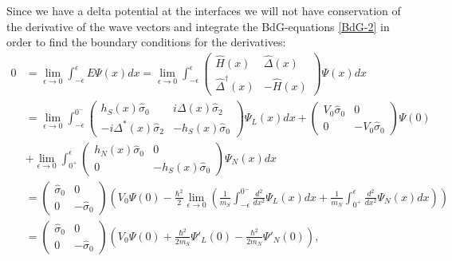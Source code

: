 Since we have a delta potential at the interfaces we will not have conservation of the derivative of the wave vectors and integrate the BdG-equations \eqref{BdG-2} in order to find the boundary conditions for the derivatives:
\begin{equation*}
\begin{split}
    0 &= \lim_{\epsilon \rightarrow 0} \int_{-\epsilon}^{\epsilon} E\Psi(x) dx = \lim_{\epsilon \rightarrow 0} \int_{-\epsilon}^{\epsilon}
    \begin{pmatrix}
    \hat{H}(x) & \hat{\Delta}(x) \\
    \hat{\Delta}^{\dagger}(x) & -\hat{H}(x)
    \end{pmatrix}
    \Psi(x)dx
    \\
    &=\lim_{\epsilon \rightarrow 0} \int_{-\epsilon}^{0^-}
    \begin{pmatrix}
    h_S(x)\hat{\sigma}_0 & i\Delta(x)\hat{\sigma}_2 \\
    -i\Delta^*(x)\hat{\sigma}_2 & -h_S(x)\hat{\sigma}_0
    \end{pmatrix}
    \Psi_{L}(x)dx
    +
    \begin{pmatrix}
    V_0\hat{\sigma}_0 & 0\\
    0 & -V_0\hat{\sigma}_0
    \end{pmatrix}
    \Psi(0)
    \\
    &+\lim_{\epsilon \rightarrow 0} \int_{0^+}^{\epsilon}
    \begin{pmatrix}
    h_N(x)\hat{\sigma}_0 & 0 \\
    0 & -h_S(x)\hat{\sigma}_0
    \end{pmatrix}
    \Psi_{N}(x)dx\\
    &=
    \begin{pmatrix}
    \hat{\sigma}_0 & 0\\
    0 & -\hat{\sigma}_0
    \end{pmatrix}
    \left(
    V_0\Psi(0)
    -\frac{\hbar^2}{2}
    \lim_{\epsilon \rightarrow 0}
    \left( \frac{1}{m_S}\int_{-\epsilon}^{0^-} 
    \frac{d^2}{dx^2} \Psi_L(x) dx
    + \frac{1}{m_N}\int_{0^+}^{\epsilon} 
    \frac{d^2}{dx^2} \Psi_N(x) dx \right)
    \right)\\
    &=
    \begin{pmatrix}
    \hat{\sigma}_0 & 0\\
    0 & -\hat{\sigma}_0
    \end{pmatrix}
    \left(
    V_0\Psi(0) +
    \frac{\hbar^2}{2m_S}
    \Psi'_L(0)
    -  \frac{\hbar^2}{2m_N}
    \Psi'_N(0) 
    \right),
\end{split}
\end{equation*}
